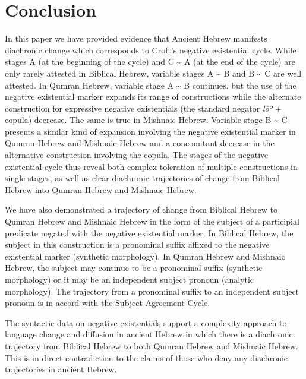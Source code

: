 ﻿\documentclass[output=paper]{langsci/langscibook}
\begin{document}
\section{Conclusion}\label{sec:Hebrew-5}
%
In this paper we have provided evidence that Ancient Hebrew manifests
diachronic change which corresponds to Croft's negative existential cycle.
While stages A (at the beginning of the cycle) and C {\textasciitilde} A
(at the end of the cycle) are only rarely attested in Biblical Hebrew,
variable stages A {\textasciitilde} B and B {\textasciitilde} C are well
attested. In Qumran Hebrew, variable stage A {\textasciitilde} B continues,
but the use of the negative existential marker expands its range of
constructions while the alternate construction for expressive negative
existentials (the standard negator \textit{lōʾ} + copula)
decrease. The same is true in Mishnaic Hebrew. Variable stage B
{\textasciitilde} C presents a similar kind of expansion involving the
negative existential marker in Qumran Hebrew and Mishnaic Hebrew and a
concomitant decrease in the alternative construction involving the copula.
The stages of the negative existential cycle thus reveal both complex
toleration of multiple constructions in single stages, as well as clear
diachronic trajectories of change from Biblical Hebrew into Qumran Hebrew
and Mishnaic Hebrew.

We have also demonstrated a trajectory of change from Biblical Hebrew to
Qumran Hebrew and Mishnaic Hebrew in the form of the subject of a
participial predicate negated with the negative existential marker. In
Biblical Hebrew, the subject in this construction is a pronominal suffix
affixed to the negative existential marker (synthetic morphology). In
Qumran Hebrew and Mishnaic Hebrew, the subject may continue to be a
pronominal suffix (synthetic morphology) or it may be an independent
subject pronoun (analytic morphology). The trajectory from a pronominal
suffix to an independent subject pronoun is in accord with the Subject
Agreement Cycle.

The syntactic data on negative existentials support a complexity approach
to language change and diffusion in ancient Hebrew in which there is a
diachronic trajectory from Biblical Hebrew to both Qumran Hebrew and
Mishnaic Hebrew. This is in direct contradiction to the claims of those who
deny any diachronic trajectories in ancient Hebrew.
\end{document}

